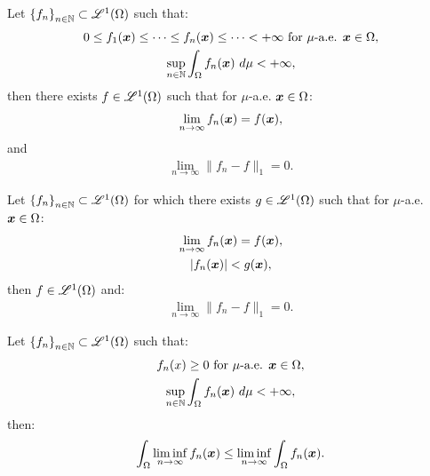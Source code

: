 \begin{theorem}
    Let $\left\{ f_n \right\}_{n \in \mathbb{N}} \subset \mathscr{L}^{1}(\Omega)$ such that:
    \begin{gather}
        0 \leq f_1(\bm{x}) \leq \dots \leq f_n(\bm{x}) \leq \dots < +\infty \text{ for } \mu \text{-a.e. } \bm{x} \in \Omega, \\
        \sup_{n \in \mathbb{N}} \int_\Omega f_n(\bm{x}) ~ d \mu < +\infty,
    \end{gather}
    then there exists $f \in \mathscr{L}^{1}(\Omega)$ such that for $\mu$-a.e. $\bm{x} \in \Omega$:
    \begin{gather}
        \lim_{n \rightarrow \infty} f_n(\bm{x}) = f(\bm{x}),
    \end{gather}
    and
    \begin{gather}
        \lim_{n \rightarrow \infty} \lVert f_n - f \rVert_1 = 0.
    \end{gather}
\end{theorem}

\begin{theorem}
    Let $\left\{ f_n \right\}_{n \in \mathbb{N}} \subset \mathscr{L}^{1}(\Omega)$ for which there exists $g \in \mathscr{L}^{1}(\Omega)$ such that for $\mu$-a.e. $\bm{x} \in \Omega$:
    \begin{gather}
        \lim_{n \rightarrow \infty} f_n(\bm{x}) = f(\bm{x}), \\
        \lvert f_n(\bm{x}) \rvert < g(\bm{x}),
    \end{gather}
    then $f \in \mathscr{L}^{1}(\Omega)$ and:
    \begin{gather}
        \lim_{n \rightarrow \infty} \lVert f_n - f \rVert_1 = 0.
    \end{gather}
\end{theorem}

\begin{lemma}[Fatou]
    Let $\left\{ f_n \right\}_{n \in \mathbb{N}} \subset \mathscr{L}^{1}(\Omega)$ such that:
    \begin{gather}
        f_n(x) \geq 0 \text{ for } \mu \text{-a.e. } \bm{x} \in \Omega, \\
        \sup_{n \in \mathbb{N}} \int_{\Omega} f_n(\bm{x}) ~ d \mu < +\infty,
    \end{gather}
    then:
    \begin{gather}
        \int_{\Omega} \liminf_{n \rightarrow \infty} f_n(\bm{x}) \leq \liminf_{n \rightarrow \infty} \int_{\Omega} f_n(\bm{x}).
    \end{gather}
\end{lemma}

